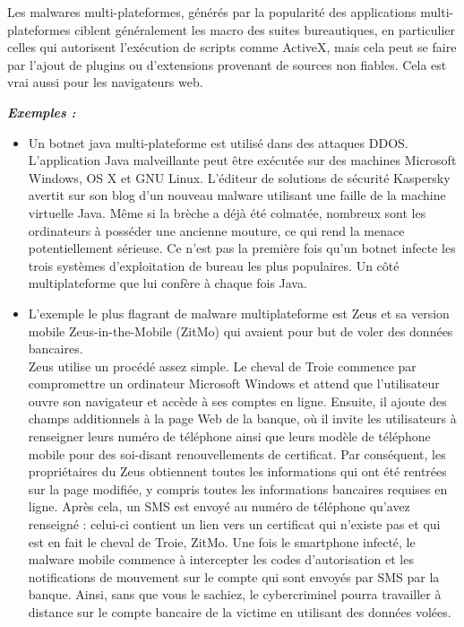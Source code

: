 Les malwares multi-plateformes, générés par la popularité des applications multi-plateformes ciblent généralement les macro des suites bureautiques, en particulier celles qui autorisent l'exécution de scripts comme ActiveX, mais cela peut se faire par l'ajout de plugins ou d'extensions provenant de sources non fiables. Cela est vrai aussi pour les navigateurs web.

\textbf{\textit{Exemples : }}\\
\begin{itemize}
\item Un botnet java multi-plateforme est utilisé dans des attaques DDOS. L'application Java malveillante peut être exécutée sur des machines Microsoft Windows, OS X et GNU Linux. L'éditeur de solutions de sécurité Kaspersky avertit sur son blog d'un nouveau malware utilisant une faille de la machine virtuelle Java. Même si la brèche a déjà été colmatée, nombreux sont les ordinateurs à posséder une ancienne mouture, ce qui rend la menace potentiellement sérieuse. Ce n'est pas la première fois qu'un botnet infecte les trois systèmes d'exploitation de bureau les plus populaires. Un côté multiplateforme que lui confère à chaque fois Java.\\


\item L'exemple le plus flagrant de malware multiplateforme est Zeus et sa version mobile Zeus-in-the-Mobile (ZitMo) qui avaient pour but de voler des données bancaires.\\
Zeus utilise un procédé assez simple. Le cheval de Troie commence par compromettre un ordinateur Microsoft Windows et attend que l'utilisateur ouvre son navigateur et accède à ses comptes en ligne. Ensuite, il ajoute des champs additionnels à la page Web de la banque, où il invite les utilisateurs à renseigner leurs numéro de téléphone ainsi que leurs modèle de téléphone mobile pour des soi-disant renouvellements de certificat. Par conséquent, les propriétaires du Zeus obtiennent toutes les informations qui ont été rentrées sur la page modifiée, y compris toutes les informations bancaires requises en ligne. Après cela, un SMS est envoyé au numéro de téléphone qu'avez renseigné : celui-ci contient un lien vers un certificat qui n'existe pas et qui est en fait le cheval de Troie, ZitMo. Une fois le smartphone infecté, le malware mobile commence à intercepter les codes d'autorisation et les notifications de mouvement sur le compte qui sont envoyés par SMS par la banque. Ainsi, sans que vous le sachiez, le cybercriminel pourra travailler à distance sur le compte bancaire de la victime en utilisant des données volées.
\end{itemize}

